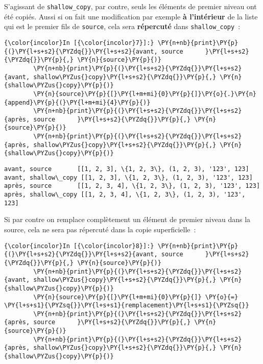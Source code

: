     S'agissant de \texttt{shallow\_copy}, par contre, seuls les éléments de
premier niveau ont été copiés. Aussi si on fait une modification par
exemple \textbf{à l'intérieur} de la liste qui est le premier fils de
\texttt{source}, cela sera \textbf{répercuté} dans
\texttt{shallow\_copy}~:

    \begin{Verbatim}[commandchars=\\\{\}]
{\color{incolor}In [{\color{incolor}7}]:} \PY{n+nb}{print}\PY{p}{(}\PY{l+s+s2}{\PYZdq{}}\PY{l+s+s2}{avant, source      }\PY{l+s+s2}{\PYZdq{}}\PY{p}{,} \PY{n}{source}\PY{p}{)}
        \PY{n+nb}{print}\PY{p}{(}\PY{l+s+s2}{\PYZdq{}}\PY{l+s+s2}{avant, shallow\PYZus{}copy}\PY{l+s+s2}{\PYZdq{}}\PY{p}{,} \PY{n}{shallow\PYZus{}copy}\PY{p}{)}
        \PY{n}{source}\PY{p}{[}\PY{l+m+mi}{0}\PY{p}{]}\PY{o}{.}\PY{n}{append}\PY{p}{(}\PY{l+m+mi}{4}\PY{p}{)}
        \PY{n+nb}{print}\PY{p}{(}\PY{l+s+s2}{\PYZdq{}}\PY{l+s+s2}{après, source      }\PY{l+s+s2}{\PYZdq{}}\PY{p}{,} \PY{n}{source}\PY{p}{)}
        \PY{n+nb}{print}\PY{p}{(}\PY{l+s+s2}{\PYZdq{}}\PY{l+s+s2}{après, shallow\PYZus{}copy}\PY{l+s+s2}{\PYZdq{}}\PY{p}{,} \PY{n}{shallow\PYZus{}copy}\PY{p}{)}
\end{Verbatim}


    \begin{Verbatim}[commandchars=\\\{\}]
avant, source       [[1, 2, 3], \{1, 2, 3\}, (1, 2, 3), '123', 123]
avant, shallow\_copy [[1, 2, 3], \{1, 2, 3\}, (1, 2, 3), '123', 123]
après, source       [[1, 2, 3, 4], \{1, 2, 3\}, (1, 2, 3), '123', 123]
après, shallow\_copy [[1, 2, 3, 4], \{1, 2, 3\}, (1, 2, 3), '123', 123]

    \end{Verbatim}

    Si par contre on remplace complètement un élément de premier niveau dans
la source, cela ne sera pas répercuté dans la copie superficielle~:

    \begin{Verbatim}[commandchars=\\\{\}]
{\color{incolor}In [{\color{incolor}8}]:} \PY{n+nb}{print}\PY{p}{(}\PY{l+s+s2}{\PYZdq{}}\PY{l+s+s2}{avant, source      }\PY{l+s+s2}{\PYZdq{}}\PY{p}{,} \PY{n}{source}\PY{p}{)}
        \PY{n+nb}{print}\PY{p}{(}\PY{l+s+s2}{\PYZdq{}}\PY{l+s+s2}{avant, shallow\PYZus{}copy}\PY{l+s+s2}{\PYZdq{}}\PY{p}{,} \PY{n}{shallow\PYZus{}copy}\PY{p}{)}
        \PY{n}{source}\PY{p}{[}\PY{l+m+mi}{0}\PY{p}{]} \PY{o}{=} \PY{l+s+s1}{\PYZsq{}}\PY{l+s+s1}{remplacement}\PY{l+s+s1}{\PYZsq{}}
        \PY{n+nb}{print}\PY{p}{(}\PY{l+s+s2}{\PYZdq{}}\PY{l+s+s2}{après, source      }\PY{l+s+s2}{\PYZdq{}}\PY{p}{,} \PY{n}{source}\PY{p}{)}
        \PY{n+nb}{print}\PY{p}{(}\PY{l+s+s2}{\PYZdq{}}\PY{l+s+s2}{après, shallow\PYZus{}copy}\PY{l+s+s2}{\PYZdq{}}\PY{p}{,} \PY{n}{shallow\PYZus{}copy}\PY{p}{)}
\end{Verbatim}


